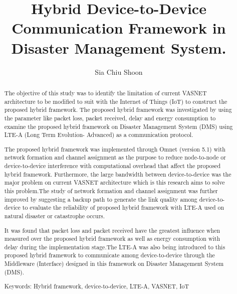 \documentclass{article}
\title{Hybrid Device-to-Device Communication Framework in Disaster Management System. }
\author{Sia Chiu Shoon}
\begin{document}
\maketitle

\begin{abstract}
The objective of this study was to identify the limitation of current VASNET architecture to be modified to suit with the Internet of Things (IoT) to construct the proposed hybrid framework. The proposed hybrid framework was investigated by using the parameter like packet loss, packet received, delay and energy consumption to examine the proposed hybrid framework on Disaster Management System (DMS) using LTE-A (Long Term Evolution- Advanced) as a communication protocol.

The proposed hybrid framework was implemented through Omnet (version 5.1) with network formation and channel assignment as the purpose to reduce node-to-node or device-to-device interference with computational overhead that affect the proposed hybrid framework. Furthermore, the large bandwidth between device-to-device was the major problem on current VASNET architecture which is this research aims to solve this problem.The study of network formation and channel assignment was further improved by suggesting a backup path to generate the link quality among device-to-device to evaluate the reliability of proposed hybrid framework with LTE-A used on natural disaster or catastrophe occurs.

It was found that packet loss and packet received have the greatest influence when measured over the proposed hybrid framework as well as energy consumption with delay during the implementation stage.The LTE-A was also being introduced to this proposed hybrid framework to communicate among device-to-device through the Middleware (Interface) designed in this framework on Disaster Management System (DMS).


Keywords: Hybrid framework, device-to-device, LTE-A, VASNET, IoT

\end{abstract}

\newpage
\end{document}
